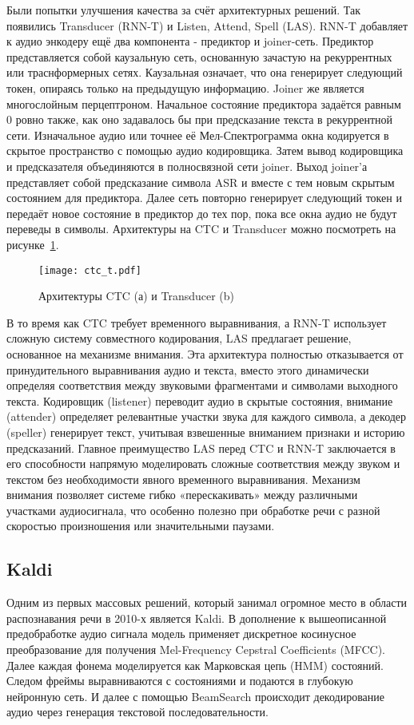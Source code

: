Были попытки улучшения качества за счёт архитектурных решений.
Так появились Transducer (RNN-T)\cite{graves2012sequence} и Listen, Attend, Spell (LAS)\cite{chan2016listen}.
RNN-T добавляет к аудио энкодеру ещё два компонента - предиктор и joiner-сеть.
Предиктор представляется собой каузальную сеть, основанную зачастую на рекуррентных или траснформерных сетях.
Каузальная означает, что она генерирует следующий токен, опираясь только на предыдущую информацию.
Joiner же является многослойным перцептроном.
Начальное состояние предиктора задаётся равным 0 ровно также, как оно задавалось бы при предсказание текста в рекуррентной сети.
Изначальное аудио или точнее её Мел-Спектрограмма окна кодируется в скрытое пространство с помощью аудио кодировщика.
Затем вывод кодировщика и предсказателя объединяются в полносвязной сети joiner.
Выход joiner'а представляет собой предсказание символа ASR и вместе с тем новым скрытым состоянием для предиктора.
Далее сеть повторно генерирует следующий токен и передаёт новое состояние в предиктор до тех пор, пока все окна аудио не будут переведы в символы.
Архитектуры на CTC и Transducer можно посмотреть на рисунке~\ref{fig:ctc_t}.

\begin{figure}[!t]
  \centering
  \texttt{[image: ctc\_t.pdf]}
  \caption{Архитектуры CTC (а) и Transducer (b)}
  \label{fig:ctc_t}
\end{figure}

В то время как CTC требует временного выравнивания, а RNN-T использует сложную систему совместного кодирования, LAS предлагает решение, основанное на механизме внимания.
Эта архитектура полностью отказывается от принудительного выравнивания аудио и текста, вместо этого динамически определяя соответствия между звуковыми фрагментами и символами выходного текста.
Кодировщик (listener) переводит аудио в скрытые состояния, внимание (attender) определяет релевантные участки звука для каждого символа, а декодер (speller) генерирует текст, учитывая взвешенные вниманием признаки и историю предсказаний.
Главное преимущество LAS перед CTC и RNN-T заключается в его способности напрямую моделировать сложные соответствия между звуком и текстом без необходимости явного временного выравнивания.
Механизм внимания позволяет системе гибко «перескакивать» между различными участками аудиосигнала, что особенно полезно при обработке речи с разной скоростью произношения или значительными паузами.

\subsection{Kaldi}
Одним из первых массовых решений, который занимал огромное место в области распознавания речи в 2010-х является Kaldi\cite{povey2011kaldi}.
В дополнение к вышеописанной предобработке аудио сигнала модель применяет дискретное косинусное преобразование для получения Mel-Frequency Cepstral Coefficients (MFCC).
Далее каждая фонема моделируется как Марковская цепь (HMM) состояний.
Следом фреймы выравниваются с состояниями и подаются в глубокую нейронную сеть.
И далее с помощью BeamSearch происходит декодирование аудио через генерация текстовой последовательности.

